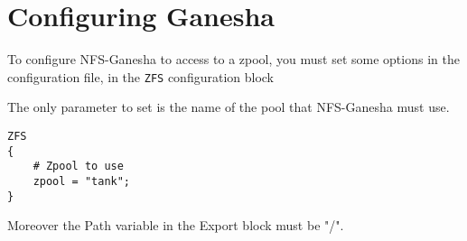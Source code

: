 \documentclass[english]{article}
\begin{document}
\section{Configuring Ganesha}

To configure NFS-Ganesha to access to a zpool, you must set some options in the
configuration file, in the \texttt{ZFS} configuration block

The only parameter to set is the name of the pool that NFS-Ganesha must use.

\begin{verbatim}
ZFS
{
    # Zpool to use
    zpool = "tank";
}
\end{verbatim}

Moreover the Path variable in the Export block must be "/".
\end{document}
